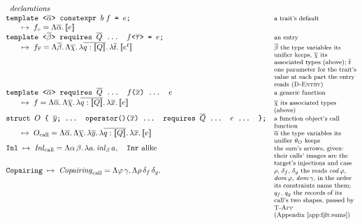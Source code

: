 \begin{figure}[htbp]
\[
\begin{array}{@{}l@{\quad}l@{}}
\multicolumn{2}{l}{\textit{declarations}} \\
\texttt{template <}\overline{\alpha}\texttt{> constexpr } b\; f \texttt{ = } e\texttt{;} & \note{a trait's default} \\
\qquad \mapsto\; f_{\circ} = \Lambda\overline{\alpha}.\,\llbracket e \rrbracket & \\
\texttt{template <}\overline{\beta}\texttt{> requires } \overline{Q}\texttt{ ... } f\texttt{<}\overline{\tau}\texttt{> = } e\texttt{;} & \note{an entry} \\
\qquad \mapsto\; f_{\overline{\tau}} = \Lambda\overline{\beta}.\,\Lambda\overline{\chi}.\,\lambda\overline{q : \llbracket Q \rrbracket}.\,\lambda\overline{t}.\,\llbracket e^{t} \rrbracket & \note{$\overline{\beta}$ the type variables its unifier keeps, $\overline{\chi}$ its associated types (above); $\overline{t}$ one parameter for the trait's value at each part the entry reads (\textsc{D-Entry})} \\
\texttt{template <}\overline{\alpha}\texttt{> requires } \overline{Q}\texttt{ ... } f\texttt{(}\overline{x}\texttt{) ... } e & \note{a generic function} \\
\qquad \mapsto\; f = \Lambda\overline{\alpha}.\,\Lambda\overline{\chi}.\,\lambda\overline{q : \llbracket Q \rrbracket}.\,\lambda\overline{x}.\,\llbracket e \rrbracket & \note{$\overline{\chi}$ its associated types (above)} \\
\texttt{struct } O \texttt{ \{ } \overline{y}\texttt{; ... operator()(}\overline{x}\texttt{) ... requires } \overline{Q}\texttt{ ... } e \texttt{ ... \};} & \note{a function object's call function} \\
\qquad \mapsto\; O_{\mathrm{call}} = \Lambda\overline{\alpha}.\,\Lambda\overline{\chi}.\,\lambda\overline{y}.\,\lambda\overline{q : \llbracket Q \rrbracket}.\,\lambda\overline{x}.\,\llbracket e \rrbracket & \note{$\overline{\alpha}$ the type variables its unifier $\theta_O$ keeps} \\
\texttt{Inl} \;\mapsto\; \mathit{Inl}_{\mathrm{call}} = \Lambda\alpha\,\beta.\,\lambda a.\,\mathit{inl}_{\beta}\,a, \quad \texttt{Inr} \text{ alike} & \note{the sum's arrows, given: their calls' images are the target's injections and case} \\
\texttt{Copairing} \;\mapsto\; \mathit{Copairing}_{\mathrm{call}} = \Lambda\varphi\,\gamma.\,\Lambda\rho\,\delta_f\,\delta_g. & \note{$\rho$, $\delta_f$, $\delta_g$ the reads $\mathit{cod}\,\varphi$, $\mathit{dom}\,\varphi$, $\mathit{dom}\,\gamma$, in the order its constraints name them; $q_f$, $q_g$ the records of its call's two shapes, passed by \textsc{T-App} (Appendix~\ref{app:fjlt:sums})} \\

\end{array}\]
\end{figure}
